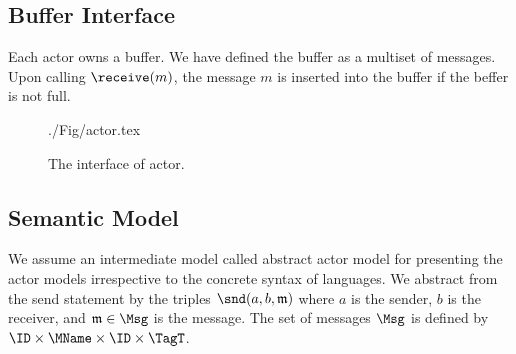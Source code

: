 

\subsection{Buffer Interface}
Each actor owns a buffer. We have defined the buffer as a multiset of messages. Upon calling $\receive(m)$, the message $m$ is inserted into the buffer if the beffer is not full. 

	\begin{figure}[htbp]
		\centering
		{./Fig/actor.tex}
		\caption{The interface of actor.}
		\label{fig::abstractActor}
	\end{figure}




\subsection{Semantic Model}
We assume an intermediate model called abstract actor model for presenting the actor models irrespective to the concrete syntax of languages. We abstract from the send statement by the triples $\snd(a,b,\mathfrak{m})$ where $a$ is the sender, $b$ is the receiver, and $\mathfrak{m}\in\Msg$ is the message. The set of messages $\Msg$ is defined by $\ID\times \MName\times \ID\times \TagT$.

